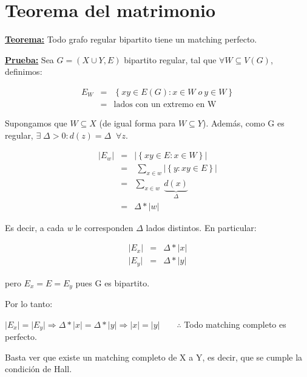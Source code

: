 \documentclass[12pt,a4paper]{report}
\begin{document}
	\section{Teorema del matrimonio}

		\textbf{\underline{Teorema:}} Todo grafo regular bipartito tiene un matching perfecto.

		\textbf{\underline{Prueba:}} Sea $G = (X \cup Y, E)$ bipartito regular, tal que $\forall W \subseteq V(G)$, definimos:

		\begin{eqnarray}
			\nonumber E_{W} &=& \left\lbrace xy \in E(G): x \in W \; o \ y \in W \right\rbrace \\
			\nonumber &=& \text{lados con un extremo en W}
		\end{eqnarray}

		Supongamos que $W \subseteq X$ (de igual forma para $W \subseteq Y$). Además, como G es regular, $\exists \; \Delta > 0 : d(z) = \Delta \; \; \forall z$.

		\begin{eqnarray}
			\nonumber \lvert E_{w} \rvert &=& \lvert \left\lbrace xy \in E: x \in W \right\rbrace \rvert \\
			\nonumber &=&\ \sum_{x \in w} \lvert \left\lbrace y : xy \in E \right\rbrace \rvert \\
			\nonumber &=& \sum_{x \in w} \; \underbrace{d(x)}_{\Delta} \\
			\nonumber &=& \Delta * \lvert w \rvert
		\end{eqnarray}

		Es decir, a cada \textit{w} le corresponden $\Delta$ lados distintos. En particular:

		\begin{eqnarray}
		\nonumber \lvert E_{x} \rvert &=& \Delta * \lvert x \rvert \\
		\nonumber \lvert E_{y} \rvert &=& \Delta * \lvert y \rvert
		\end{eqnarray}

		pero $E_{x} = E = E_{y}$ pues G es bipartito.

		\vspace{5mm}
		Por lo tanto:

		\vspace{3mm}
		$ \lvert E_{x} \rvert = \lvert E_{y} \rvert \Rightarrow \Delta * \lvert x \rvert = \Delta * \lvert y \rvert \Rightarrow \lvert x \rvert = \lvert y \rvert \qquad \therefore$ Todo matching completo es perfecto.


		Basta ver que existe un matching completo de X a Y, es decir, que se cumple la condición de Hall.
\end{document}
